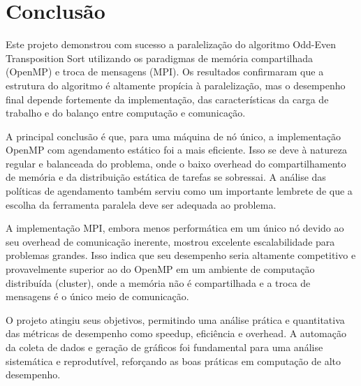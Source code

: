 \documentclass[12pt, a4paper]{article}
\begin{document}
\section{Conclusão}

Este projeto demonstrou com sucesso a paralelização do algoritmo Odd-Even Transposition Sort utilizando os paradigmas de memória compartilhada (OpenMP) e troca de mensagens (MPI). Os resultados confirmaram que a estrutura do algoritmo é altamente propícia à paralelização, mas o desempenho final depende fortemente da implementação, das características da carga de trabalho e do balanço entre computação e comunicação.

A principal conclusão é que, para uma máquina de nó único, a implementação OpenMP com agendamento estático foi a mais eficiente. Isso se deve à natureza regular e balanceada do problema, onde o baixo overhead do compartilhamento de memória e da distribuição estática de tarefas se sobressai. A análise das políticas de agendamento também serviu como um importante lembrete de que a escolha da ferramenta paralela deve ser adequada ao problema.

A implementação MPI, embora menos performática em um único nó devido ao seu overhead de comunicação inerente, mostrou excelente escalabilidade para problemas grandes. Isso indica que seu desempenho seria altamente competitivo e provavelmente superior ao do OpenMP em um ambiente de computação distribuída (cluster), onde a memória não é compartilhada e a troca de mensagens é o único meio de comunicação.

O projeto atingiu seus objetivos, permitindo uma análise prática e quantitativa das métricas de desempenho como speedup, eficiência e overhead. A automação da coleta de dados e geração de gráficos foi fundamental para uma análise sistemática e reprodutível, reforçando as boas práticas em computação de alto desempenho.
\end{document}
